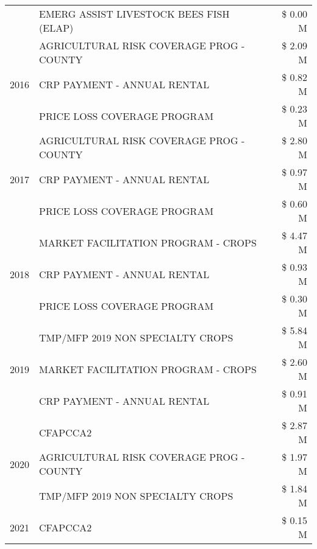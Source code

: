 \begin{tabular}{llr}
 & EMERG ASSIST LIVESTOCK BEES FISH (ELAP) & \$ 0.00 M \\
\cline{1-3}
\multirow[t]{3}{*}{2016} & AGRICULTURAL RISK COVERAGE PROG - COUNTY      & \$ 2.09 M \\
 & CRP PAYMENT - ANNUAL RENTAL                   & \$ 0.82 M \\
 & PRICE LOSS COVERAGE PROGRAM                   & \$ 0.23 M \\
\cline{1-3}
\multirow[t]{3}{*}{2017} & AGRICULTURAL RISK COVERAGE PROG - COUNTY & \$ 2.80 M \\
 & CRP PAYMENT - ANNUAL RENTAL & \$ 0.97 M \\
 & PRICE LOSS COVERAGE PROGRAM & \$ 0.60 M \\
\cline{1-3}
\multirow[t]{3}{*}{2018} & MARKET FACILITATION PROGRAM - CROPS & \$ 4.47 M \\
 & CRP PAYMENT - ANNUAL RENTAL & \$ 0.93 M \\
 & PRICE LOSS COVERAGE PROGRAM & \$ 0.30 M \\
\cline{1-3}
\multirow[t]{3}{*}{2019} & TMP/MFP 2019 NON SPECIALTY CROPS & \$ 5.84 M \\
 & MARKET FACILITATION PROGRAM - CROPS & \$ 2.60 M \\
 & CRP PAYMENT - ANNUAL RENTAL & \$ 0.91 M \\
\cline{1-3}
\multirow[t]{3}{*}{2020} & CFAPCCA2 & \$ 2.87 M \\
 & AGRICULTURAL RISK COVERAGE PROG - COUNTY & \$ 1.97 M \\
 & TMP/MFP 2019 NON SPECIALTY CROPS & \$ 1.84 M \\
\cline{1-3}
2021 & CFAPCCA2 & \$ 0.15 M \\
\cline{1-3}
\bottomrule
\end{tabular}
